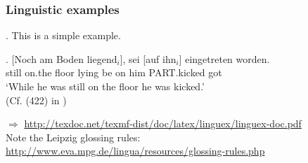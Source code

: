 \begin{frame}[fragile]
\begin{itemize}
\end{itemize} 

\end{frame}

\begin{frame}
\frametitle{Linguistic examples}
\ex. This is a simple example.

\exg. [Noch am Boden liegend$_i$], sei [auf ihn$_i$] eingetreten worden.\\
still on.the floor lying be on him PART.kicked got\\
`While he was still on the floor he was kicked.'\\
(Cf. (422) in \cite{Mueller:02})

\noindent $\Rightarrow$ \url{http://texdoc.net/texmf-dist/doc/latex/linguex/linguex-doc.pdf} \\
Note the Leipzig glossing rules: \url{http://www.eva.mpg.de/lingua/resources/glossing-rules.php}
\end{frame}

